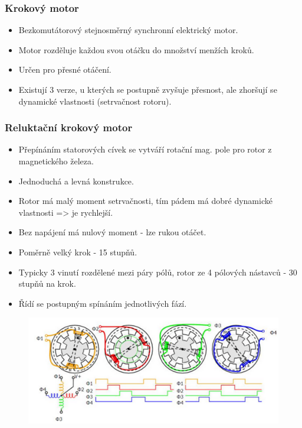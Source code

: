 \subsubsection*{Krokový motor}
\begin{itemize}
  \item Bezkomutátorový stejnosměrný synchronní elektrický motor.
  \item Motor rozděluje každou svou otáčku do množství menžích kroků.
  \item Určen pro přesné otáčení.
  \item Existují 3 verze, u kterých se postupně zvyšuje přesnost, ale zhoršují se dynamické vlastnosti (setrvačnost rotoru).
\end{itemize}

\subsubsection*{Reluktační krokový motor}
\begin{itemize}
  \item Přepínáním statorových cívek se vytváří rotační mag. pole pro rotor z magnetického železa.
  \item Jednoduchá a levná konstrukce.
  \item Rotor má malý moment setrvačnosti, tím pádem má dobré dynamické vlastnosti => je rychlejší.
  \item Bez napájení má nulový moment - lze rukou otáčet.
  \item Poměrně velký krok - 15 stupňů.
  \item Typicky 3 vinutí rozdělené mezi páry pólů, rotor ze 4 pólových nástavců - 30 stupňů na krok.
  \item Řídí se postupným spínáním jednotlivých fází.
\end{itemize}

\begin{figure}[h]
  \begin{center}
    \includegraphics[scale = 1]{img/picture7.png}
  \end{center}
\end{figure}

